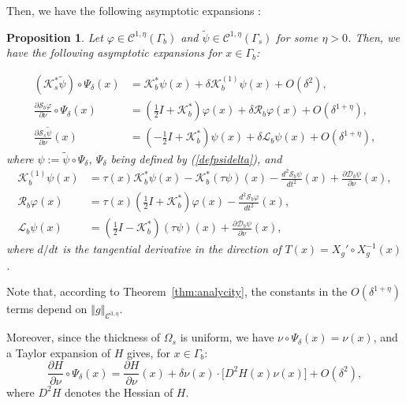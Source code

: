 \documentclass[final]{siamltex}
\numberwithin{equation}{section}
\numberwithin{figure}{section}
\numberwithin{table}{section}
\newtheorem{prop}{Proposition}
\begin{document}
Then, we have the following asymptotic expansions \cite{ammari2010conductivity,zribilayer}:
\begin{prop} \label{pro:DL_operators}Let $\varphi\in\mathcal{C}^{1,\eta}(\Gamma_{b})$
and $\tilde{\psi}\in\mathcal{C}^{1,\eta}(\Gamma_{s})$ for some $\eta>0$.
Then, we have the following asymptotic expansions for $x\in\Gamma_{b}$:

\begin{equation}
\begin{aligned}\left(\mathcal{K}_{s}^{*}\tilde{\psi}\right)\circ\Psi_{\delta}(x) & =\mathcal{K}_{b}^{*}\psi(x)+\delta\mathcal{K}_{b}^{(1)}\psi(x)
+O(\delta^{2}),\\
\frac{\partial\mathcal{S}_{b}\varphi}{\partial\nu}\circ\Psi_{\delta}(x) & =\left(\frac{1}{2}I+\mathcal{K}_{b}^{*}\right)\varphi(x)+\delta\mathcal{R}_{b}\varphi(x)+O(\delta^{1+\eta}),\\
\frac{\partial\mathcal{S}_{s}\tilde{\psi}}{\partial\nu}(x) & =\left(-\frac{1}{2}I+\mathcal{K}_{b}^{*}\right)\psi(x)+\delta\mathcal{L}_{b}\psi(x)+O(\delta^{1+\eta}),
\end{aligned}
\label{eq:DL_operators}
\end{equation}
 where $\psi:=\tilde{\psi}\circ\Psi_{\delta}$, $\Psi_\delta$ being defined by (\ref{defpsidelta}), and
\begin{equation}
\begin{aligned}\mathcal{K}_{b}^{(1)}\psi(x) & =\tau(x)\mathcal{K}_{b}^{*}\psi(x)-\mathcal{K}_{b}^{*}(\tau\psi)(x)-\frac{d^{2}\mathcal{S}_{b}\psi}{dt^{2}}(x)+\frac{\partial\mathcal{D}_{b}\psi}{\partial\nu}(x),\\
\mathcal{R}_{b}\varphi(x) & =\tau(x)\left(\frac{1}{2}I+\mathcal{K}_{b}^{*}\right)\varphi(x)
-\frac{d^{2}\mathcal{S}_{b}\varphi}{dt^{2}}(x),\\
\mathcal{L}_{b}\psi(x) & =\left(\frac{1}{2}I-\mathcal{K}_{b}^{*}\right)(\tau\psi)(x)+\frac{\partial\mathcal{D}_{b}\psi}{\partial\nu}(x),
\end{aligned}
\label{eq:definition_K1_R_L}
\end{equation}
 where $d/dt$ is the tangential derivative in the direction of $T(x)=X_g' \circ X_g^{-1}(x)$.
\end{prop} Note that, according to Theorem~\ref{thm:analycity}, the constants in the $O(\delta^{1+\eta})$ terms depend on
$\left\Vert g\right\Vert _{\mathcal{C}^{3,\eta}}$.

Moreover, since the thickness of $\Omega_{s}$ is uniform, we have
$\nu\circ\Psi_{\delta}(x)=\nu(x)$, and a Taylor expansion of $H$
gives, for $x\in\Gamma_{b}$:
\begin{equation}
\frac{\partial H}{\partial\nu}\circ\Psi_{\delta}(x)=\frac{\partial
H}{\partial\nu}(x) +\delta \nu(x) \cdot \big[ D^{2}H(x)\nu(x)
\big] +O(\delta^{2}),\label{eq:DL_H}
\end{equation}
 where $D^{2}H$ denotes the Hessian of $H$.
\end{document}
